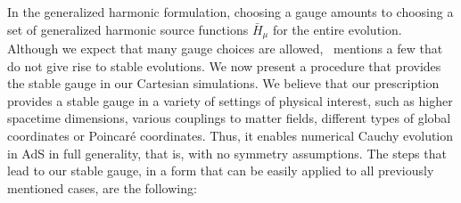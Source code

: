 \documentclass[a4paper,11pt]{article}
\numberwithin{equation}{section}
\begin{document}
In the generalized harmonic formulation, choosing a gauge amounts to choosing a set of generalized harmonic source functions $\bar{H}_\mu$ for the entire evolution. Although we expect that many gauge choices are allowed,~\cite{Bantilan:2012vu} mentions a few that do not give rise to stable evolutions. We now present a procedure that provides the stable gauge in our Cartesian simulations. We believe that our prescription provides a stable gauge in a variety of settings of physical interest, such as higher spacetime dimensions, various couplings to matter fields, different types of global coordinates or  Poincar\'{e} coordinates. Thus, it enables numerical Cauchy evolution in AdS in full generality, that is, with no symmetry assumptions.
The steps that lead to our stable gauge, in a form that can be easily applied to all previously mentioned cases, are the following: 
\end{document}
